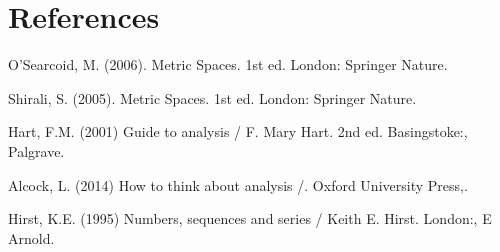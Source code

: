 \documentclass[10pt]{article}
\begin{document}
\newpage
\section{References}
\begin{thebibliography}{1}
O'Searcoid, M. (2006). Metric Spaces. 1st ed. London: Springer Nature.

Shirali, S. (2005). Metric Spaces. 1st ed. London: Springer Nature.

Hart, F.M. (2001) Guide to analysis / F. Mary Hart. 2nd ed. Basingstoke:, Palgrave.

Alcock, L. (2014) How to think about analysis /. Oxford University Press,.

Hirst, K.E. (1995) Numbers, sequences and series / Keith E. Hirst. London:, E Arnold.

\end{thebibliography}
\end{document}
